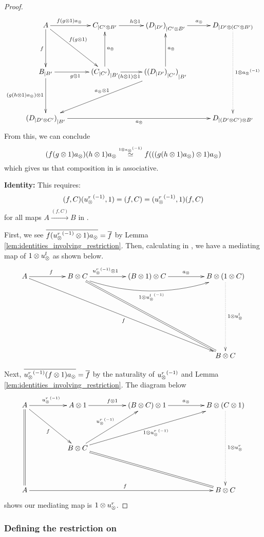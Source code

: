 \begin{proof}
  \[
    \xymatrix @C=30pt @R=45pt{
      A \ar[d]_f \ar[r]^(.4){f (g\*1) a_{\*}} \ar[dr]^(.4){f(g\*1)} &
        \xtdmn{C}{C' \* B'} \ar[r]^{h\*1}
        & \xtdmn{(\xtdmn{D}{D'})}{C' \* B'} \ar[r]^{a_{\*}}
        & \xtdmn{D}{D' \* (C' \* B')}
        \ar@{.>}[dd]^{1\*\inv{a_{\*}}}\\
      \xtdmn{B}{B'} \ar[d]_{(g (h\*1) a_{\*})\*1} \ar[r]_{g\*1}
        &\xtdmn{(\xtdmn{C}{C'})}{B'} \ar[u]_{a_{\*}} \ar[r]_(.4){(h\*1)\*1}
        & \xtdmn{(\xtdmn{(\xtdmn{D}{D'})}{C'})}{B'}
        \ar[u]_{a_\*} \ar[dll]_{a_{\*}\*1}
      \\
      \xtdmn{(\xtdmn{D}{D' \* C'})}{B'}  \ar[rrr]_{a_{\*}}
        &&& \xtdmn{D}{(D' \* C') \* B'} %
    }
  \]
  From this, we can conclude
  \[ 
    (f(g\otimes1)a_{\otimes}) (h\otimes1)a_{\otimes} \overset{\scriptscriptstyle 1\otimes{a_{\otimes}}^{(-1)}}{\simeq} f (((g(h\otimes1)a_{\otimes})\otimes1) a_{\otimes}) 
  \]
  which gives us that composition in \Xt is associative.

  \textbf{Identity:} This requires:
  \[
    (f,C) ({u_{\otimes}^r}^{(-1)}, 1) = (f,C) = ({u_{\otimes}^r}^{(-1)}, 1) (f,C)
  \]
  for all maps $A\xrightarrow{(f,C)}B$ in \Xt.

  First, we see $\overline{f ({u_{\otimes}^r}^{(-1)}\otimes1) a_{\otimes}} = \overline{f}$ by Lemma
  \vref{lem:identities_involving_restriction}. Then, calculating in \X, we have a mediating map of
  $1 \otimes u_{\otimes}^l$ as shown below.
  \[
    \xymatrix @C=50pt @R=45pt{
      A \ar[r]^f \ar[ddrrr]_f&
        B \* C \ar[r]^(.4){\inv{\usr}\*1}
        \ar@/_20pt/[rr]_{1 \* \inv{\usl}}
        \ar@{=}[ddrr]
        & (B \* 1) \* C \ar[r]^{a_{\*}}
        & B \* (1 \* C) \ar@{.>}[dd]^{1 \* \usl} \\
      \\
      &&& B \* C
    }
  \]

  Next, $\overline{{u_{\otimes}^r}^{(-1)} (f \otimes1)  a_{\otimes}} = \overline{f}$ by the naturality of ${u_{\otimes}^r}^{(-1)}$ and
  Lemma \vref{lem:identities_involving_restriction}. The diagram below
  \[
    \xymatrix @C=50pt @R=45pt{
      A \ar@{=}[dd] \ar[r]^{\inv{\usr}} \ar[dr]_{f}
        &      A \* 1 \ar[r]^{f \* 1}
        & (B \* C) \* 1 \ar[r]^{a_{\*}}
        & B \* (C \* 1)\ar@{.>}[dd]^{1 \* \usr} \\
      &B\*C \ar[ur]^{\inv{\usr}} \ar[urr]_{1\*\inv{\usr}} \ar@{=}[drr]\\
      A \ar[rrr]^f &&& B \* C
    }
  \]
  shows our mediating map is $1 \otimes u_{\otimes}^r$.
\end{proof}

\subsubsection{Defining the restriction on \hypXt} %
\label{ssub:defining_the_restriction_on_hypxt}



